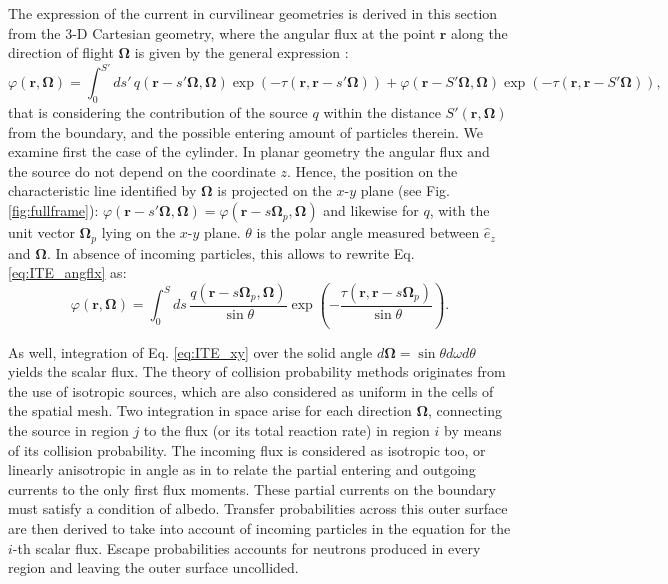 \documentclass{ictt26}
\begin{document}
The expression of the current in curvilinear geometries is derived in this section from the 3-D Cartesian geometry, where the angular flux at the point $\mathbf{r}$ along the direction of flight $\mathbf{\Omega}$ is given by the general expression \cite{lewis1984computational}:
\begin{equation}
\varphi(\mathbf{r}, \mathbf{\Omega}) = \int_0^{S'}{ds'\, q(\mathbf{r} - s' \mathbf{\Omega}, \mathbf{\Omega}) \exp(-\tau(\mathbf{r}, \mathbf{r} - s' \mathbf{\Omega}))} + \varphi(\mathbf{r} - S' \mathbf{\Omega}, \mathbf{\Omega}) \exp(-\tau(\mathbf{r}, \mathbf{r} - S' \mathbf{\Omega})),
\label{eq:ITE_angflx}
\end{equation}
that is considering the contribution of the source $q$ within the distance $S'(\mathbf{r}, \mathbf{\Omega})$ from the boundary, and the possible entering amount of particles therein. We examine first the case of the cylinder. In planar geometry the angular flux and the source do not depend on the coordinate $z$. Hence, the position on the characteristic line identified by $\mathbf{\Omega}$ is projected on the $x$-$y$ plane (see Fig. \ref{fig:fullframe}): $\varphi(\mathbf{r} - s' \mathbf{\Omega},\mathbf{\Omega}) = \varphi(\mathbf{r} - s \mathbf{\Omega}_p,\mathbf{\Omega})$ and likewise for $q$, with the unit vector $\mathbf{\Omega}_p$ lying on the $x$-$y$ plane. $\theta$ is the polar angle measured between $\hat{e}_z$ and $\mathbf{\Omega}$. In absence of incoming particles, this allows to rewrite Eq. \ref{eq:ITE_angflx} as:
\begin{equation}
\varphi(\mathbf{r}, \mathbf{\Omega}) = \int_0^S{ds\, \frac{q(\mathbf{r} - s \mathbf{\Omega}_p, \mathbf{\Omega})}{\sin \theta} \exp(-\frac{\tau(\mathbf{r}, \mathbf{r} - s \mathbf{\Omega}_p)}{\sin \theta})}. %
\label{eq:ITE_xy}
\end{equation}

As well, integration of Eq. \ref{eq:ITE_xy} over the solid angle $d\mathbf{\Omega} = \sin \theta d\omega d \theta$ yields the scalar flux. The theory of collision probability methods originates from the use of isotropic sources, which are also considered as uniform in the cells of the spatial mesh. Two integration in space arise for each direction $\mathbf{\Omega}$, connecting the source in region $j$ to the flux (or its total reaction rate) in region $i$ by means of its collision probability. The incoming flux is considered as isotropic too, or linearly anisotropic in angle as in \cite{hebert2009applied} to relate the partial entering and outgoing currents to the only first flux moments. These partial currents on the boundary must satisfy a condition of albedo. Transfer probabilities across this outer surface are then derived to take into account of incoming particles in the equation for the $i$-th scalar flux. Escape probabilities accounts for neutrons produced in every region and leaving the outer surface uncollided.
\end{document}
